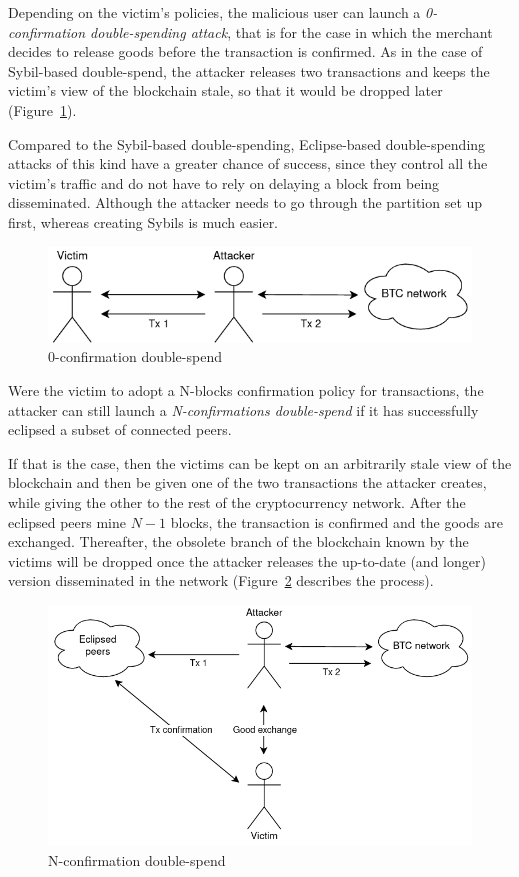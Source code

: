 Depending on the victim's policies, the malicious user can launch a \textit{0-confirmation double-spending attack}, that is for the case in which the merchant decides to release goods before the transaction is confirmed. As in the case of Sybil-based double-spend, the attacker releases two transactions and keeps the victim's view of the blockchain stale, so that it would be dropped later (Figure~\ref{fig:0confirm}).

Compared to the Sybil-based double-spending, Eclipse-based double-spending attacks of this kind have a greater chance of success, since they control all the victim's traffic and do not have to rely on delaying a block from being disseminated. Although the attacker needs to go through the partition set up first, whereas creating Sybils is much easier.

\begin{figure}[h!]
	\includegraphics[width=.7\textwidth]{pict/0confirm-doublespend.png}
	\centering
	\caption{0-confirmation double-spend}
	\label{fig:0confirm}
\end{figure}

Were the victim to adopt a N-blocks confirmation policy for transactions, the attacker can still launch a \textit{N-confirmations double-spend} if it has successfully eclipsed a subset of connected peers.

If that is the case, then the victims can be kept on an arbitrarily stale view of the blockchain and then be given one of the two transactions the attacker creates, while giving the other to the rest of the cryptocurrency network. After the eclipsed peers mine $N - 1$ blocks, the transaction is confirmed and the goods are exchanged. Thereafter, the obsolete branch of the blockchain known by the victims will be dropped once the attacker releases the up-to-date (and longer) version disseminated in the network (Figure~\ref{fig:nconfirm} describes the process).

\begin{figure}[h!]
	\includegraphics[width=.75\textwidth]{pict/nconfirm-doublespend.png}
	\centering
	\caption{N-confirmation double-spend}
	\label{fig:nconfirm}
\end{figure}


